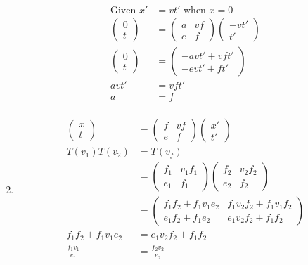 \documentclass[11pt,letterpaper, twocolumn]{article}
\begin{document}
\begin{enumerate}[label=(\alph*)]
\begin{align*}
        \text{Given }x'&=vt'\text{ when }x=0\\
        \begin{pmatrix}0\\t\end{pmatrix} &= \begin{pmatrix}a&vf\\e&f\end{pmatrix}\begin{pmatrix}-vt'\\t'\end{pmatrix}\\
        \begin{pmatrix}0\\t\end{pmatrix} &= \begin{pmatrix}-avt'+vft'\\-evt'+ft'\end{pmatrix}\\
        avt'&=vft'\\
        a&=f\\
    \end{align*}
    \item \begin{align*}
        \begin{pmatrix}x\\t\end{pmatrix} &= \begin{pmatrix}f&vf\\e&f\end{pmatrix}\begin{pmatrix}x'\\t'\end{pmatrix}\\
        T(v_1)T(v_2) &= T(v_f)\\
        &=\begin{pmatrix}f_1&v_1f_1\\e_1&f_1\end{pmatrix}\begin{pmatrix}f_2&v_2f_2\\e_2&f_2\end{pmatrix}\\
        &=\begin{pmatrix}f_1f_2+f_1v_1e_2 & f_1v_2f_2+f_1v_1f_2\\e_1f_2+f_1e_2 & e_1v_2f_2+f_1f_2\end{pmatrix}\\
        f_1f_2+f_1v_1e_2 &= e_1v_2f_2+f_1f_2\\
        \frac{f_1v_1}{e_1} &= \frac{f_2v_2}{e_2}\\

\end{align*}
\end{enumerate}
\end{document}
